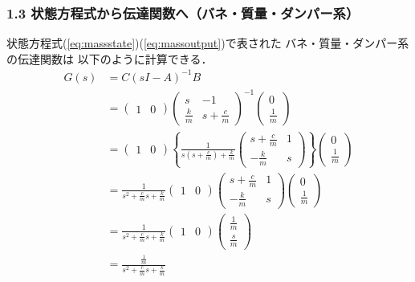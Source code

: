 \begin{frame}[t]
\frametitle{1.3 状態方程式から伝達関数へ{\small （バネ・質量・ダンパー系）}}
状態方程式(\ref{eq:massstate})(\ref{eq:massoutput})で表された
バネ・質量・ダンパー系の伝達関数は
以下のように計算できる．
\begin{align}
 G(s)
 &= C (s I - A)^{-1} B \\
 &= \left(
     \begin{array}{cc}
      1 & 0
     \end{array}
    \right)
    \left(
     \begin{array}{cc}
      s           & -1 \\
      \frac{k}{m} & s+\frac{c}{m}
     \end{array}
    \right)^{-1}
    \left(
     \begin{array}{c}
      0 \\
      \frac{1}{m}
     \end{array}
    \right) \nonumber \\
 &= \left(
     \begin{array}{cc}
      1 & 0
     \end{array}
    \right)
    \left\{
     \frac{1}{s(s + \frac{c}{m})+\frac{k}{m}}
     \left(
     \begin{array}{cc}
      s+\frac{c}{m} & 1 \\
      -\frac{k}{m}  & s
     \end{array}
     \right)
    \right\}
    \left(
     \begin{array}{c}
      0 \\
      \frac{1}{m}
     \end{array}
    \right) \nonumber \\
 &= \frac{1}{s^2 + \frac{c}{m}s + \frac{k}{m}}
    \left(
     \begin{array}{cc}
      1 & 0
     \end{array}
    \right)
    \left(
     \begin{array}{cc}
      s+\frac{c}{m} & 1 \\
      -\frac{k}{m}  & s
     \end{array}
    \right)
    \left(
     \begin{array}{c}
      0 \\
      \frac{1}{m}
     \end{array}
    \right) \nonumber \\
 &= \frac{1}{s^2 + \frac{c}{m}s + \frac{k}{m}}
    \left(
     \begin{array}{cc}
      1 & 0
     \end{array}
    \right)
    \left(
     \begin{array}{c}
      \frac{1}{m} \\
      \frac{s}{m}
     \end{array}
    \right) \nonumber \\
 &= \frac{\frac{1}{m}}{s^2 + \frac{c}{m}s + \frac{k}{m}}
\end{align}
\end{frame}

